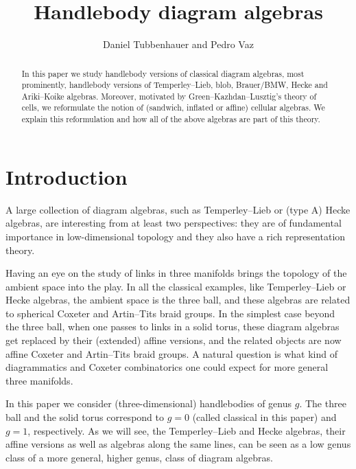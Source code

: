 \documentclass[a4paper,11pt]{amsart}
\title[Handlebody diagram algebras]
{Handlebody diagram algebras}
\author[Daniel Tubbenhauer and Pedro Vaz]{Daniel Tubbenhauer and Pedro Vaz}
\numberwithin{equation}{section}
\renewcommand{\theequation}{\thesection-\arabic{equation}}
\begin{document}
\begin{abstract}
In this paper we study handlebody versions 
of classical diagram algebras, most prominently, 
handlebody versions of Temperley--Lieb, blob, 
Brauer/BMW, Hecke and Ariki--Koike algebras.
Moreover, motivated by Green--Kazhdan--Lusztig's 
theory of cells, we reformulate the notion of 
(sandwich, inflated or affine) cellular algebras.
We explain this reformulation
and how all of the above algebras 
are part of this theory.
\end{abstract}

\renewcommand{\theequation}{\thesection-\arabic{equation}}


\maketitle

\tableofcontents

\section{Introduction}\label{section:intro}

A large collection of diagram algebras, such as Temperley--Lieb 
or (type A) Hecke algebras, are interesting from at least two perspectives:
they are of fundamental importance in low-dimensional topology 
and they also have a rich representation theory.

Having an eye on the study of links in 
three manifolds brings the topology of the ambient space into the play.
In all the classical examples, like Temperley--Lieb or 
Hecke algebras, the ambient space is the three ball, and these algebras 
are related to spherical Coxeter and Artin--Tits braid groups.
In the simplest case beyond the three ball, 
when one passes to links in a solid torus, 
these diagram algebras get replaced by their (extended) affine versions, 
and the related objects are now affine Coxeter and Artin--Tits braid groups.
A natural question is what kind of diagrammatics and Coxeter combinatorics 
one could expect for more general three manifolds.

In this paper we consider (three-dimensional) handlebodies of genus $g$. 
The three ball and the solid torus correspond to 
$g=0$ (called classical in this paper) and $g=1$, respectively.
As we will see, the Temperley--Lieb and Hecke algebras, their 
affine versions as well 
as algebras along the same lines, 
can be seen as a low genus class
of a more general, higher genus, class of diagram algebras.
\end{document}

